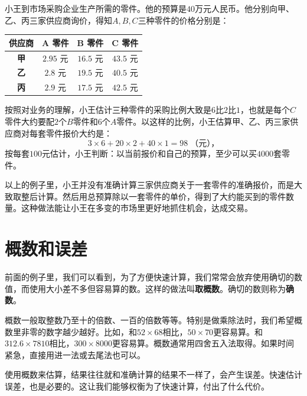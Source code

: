 \documentclass[12pt,UTF8,fontset=none]{ctexbook}
\begin{document}
\begin{ex}
    小王到市场采购企业生产所需的零件。他的预算是$40$万元人民币。他分别向甲、乙、丙三家供应商询价，得知$A,B,C$三种零件的价格分别是：
    \begin{table}[htbp]
        \centering
        \label{tab:报价表}
        \begin{tabular}{|c|c|c|c|}
            \hline
            \textbf{供应商} & \textbf{A 零件} & \textbf{B 零件} & \textbf{C 零件} \\
            \hline
            \textbf{甲} & $2.95$ 元 & $16.5$ 元 & $43.5$ 元 \\
            \hline
            \textbf{乙} & $2.8$ 元 & $19.5$ 元 & $40.5$ 元 \\
            \hline
            \textbf{丙} & $2.9$ 元 & $17.5$ 元 & $42.5$ 元 \\
            \hline
        \end{tabular}
    \end{table}

    按照对业务的理解，小王估计三种零件的采购比例大致是$6$比$2$比$1$，也就是每个$C$零件大约要配$2$个$B$零件和$6$个$A$零件。以这样的比例，小王估算甲、乙、丙三家供应商对每套零件报价大约是：
    $$ 3\times 6 + 20 \times 2 + 40\times 1 = 98 \;\mbox{（元），} $$
    按每套$100$元估计，小王判断：以当前报价和自己的预算，至少可以买$4000$套零件。
\end{ex}

以上的例子里，小王并没有准确计算三家供应商关于一套零件的准确报价，而是大致取整后计算。然后用总预算除以一套零件的单价，得到了大约能买到的零件数量。这种做法能让小王在多变的市场里更好地抓住机会，达成交易。

\section{概数和误差}

前面的例子里，我们可以看到，为了方便快速计算，我们常常会放弃使用确切的数值，而使用大小差不多但容易算的数。这样的做法叫\textbf{取概数}。确切的数则称为\textbf{确数}。

概数一般取整数乃至十的倍数、一百的倍数等等。特别是做乘除法时，我们希望概数里非零的数字越少越好。比如，和$52 \times 68$相比，$50\times 70$更容易算。和$312.6 \times 7810$相比，$300 \times 8000$更容易算。概数通常用四舍五入法取得。如果时间紧急，直接用进一法或去尾法也可以。

使用概数来估算，结果往往就和准确计算的结果不一样了，会产生误差。快速估计误差，也是必要的。这让我们能够权衡为了快速计算，付出了什么代价。
\end{document}
